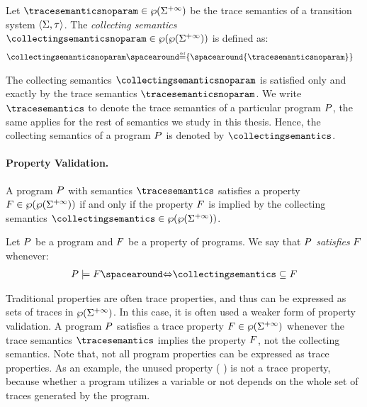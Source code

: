 \begin{definition}
  Let $\tracesemanticsnoparam\in\tracetype$ be the trace semantics of a transition system $\langle \Sigma, \tau \rangle$. The \emph{collecting semantics} $\collectingsemanticsnoparam\in\collectingtype$ is defined as:
  \begin{align*}
    \collectingsemanticsnoparam &\DefeQ \{\spacearound{\tracesemanticsnoparam}\}
  \end{align*}
\end{definition}

The collecting semantics $\collectingsemanticsnoparam$ is satisfied only and exactly by the trace semantics $\tracesemanticsnoparam$.
We write $\tracesemantics$ to denote the trace semantics of a particular program $P$, the same applies for the rest of semantics we study in this thesis. Hence, the collecting semantics of a program $P$ is denoted by $\collectingsemantics$.

\paragraph{Property Validation.}

A program $P$ with semantics $\tracesemantics$ satisfies a property $F \in \wp(\wp(\Sigma^{+\infty}))$ if and only if the property $F$ is implied by the collecting semantics $\collectingsemantics\in\collectingtype$.


\begin{definition}
  Let $P$ be a program and $F$ be a property of programs. We say that $P$ \emph{satisfies} $F$ whenever:
  \begin{align*}
    \defprogram \satisfies \defproperty \IfF \collectingsemantics \subseteq \defproperty
  \end{align*}
\end{definition}

Traditional properties are often trace properties, and thus can be expressed as sets of traces in $\wp(\Sigma^{+\infty})$. In this case, it is often used a weaker form of property validation. A program $P$ satisfies a trace property $F\in\wp(\Sigma^{+\infty})$ whenever the trace semantics $\tracesemantics$ implies the property $F$, not the collecting semantics. Note that, not all program properties can be expressed as trace properties. As an example, the unused property  (\cf{} ) is not a trace property, because whether a program utilizes a variable or not depends on the whole set of traces generated by the program.

